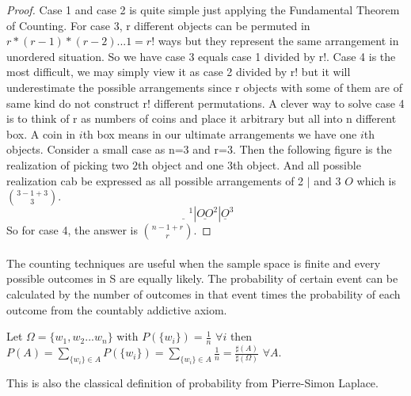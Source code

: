 \documentclass[11pt]{report}
\begin{document}
\begin{proof}
Case 1 and case 2 is quite simple just applying the Fundamental Theorem of Counting. For case 3, r different objects can be permuted in $r*(r-1)*(r-2)...1=r!$ ways but they represent the same arrangement in unordered situation. So we have case 3 equals case 1 divided by r!. Case 4 is the most difficult, we may simply view it as case 2 divided by r! but it will underestimate the possible arrangements since r objects with some of them are of same kind do not construct r! different permutations. A clever way to solve case 4 is to think of r as numbers of coins and place it arbitrary but all into n different box. A coin in $i$th box means in our ultimate arrangements we have one $i$th objects. Consider a small case as n=3 and r=3. Then the following figure is the realization of picking two $2$th object and one $3$th object. And all possible realization cab be expressed as all possible arrangements of 2 $|$ and 3 $O$ which is $\binom{3-1+3}{3}$. 
$$\underline{\quad}^1 |\underline{OO}^2 |\underline{O}^3$$ So for case 4, the answer is $\binom{n-1+r}{r}$.
\end{proof}
\paragraph{}
The counting techniques are useful when the sample space is finite and every possible outcomes in S are equally likely. The probability of certain event can be calculated by the number of outcomes in that event times the probability of each outcome from the countably addictive axiom.
\begin{theorem}
Let $\Omega=\{w_1,w_2...w_n\}$ with $P(\{w_i\})=\frac{1}{n}$ $\forall i$ then $P(A)=\sum_{\{w_i\}\in A}P(\{w_i\})=\sum_{\{w_i\}\in A}\frac{1}{n}=\frac{\sharp(A)}{\sharp(\Omega)}$ $\forall A$.
\end{theorem}
\begin{remark}
This is also the classical definition of probability from Pierre-Simon Laplace.
\end{remark} 
\end{document}
